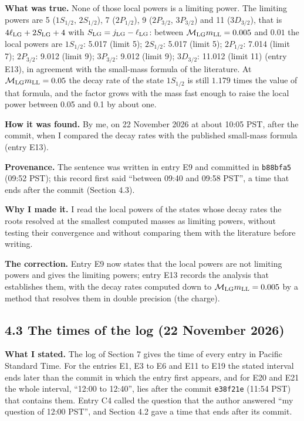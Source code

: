 \documentclass[
  10pt,
]{article}
\begin{document}
\textbf{What was true.} None of those local powers is a limiting power.
The limiting powers are 5 (\(1S_{1/2}\), \(2S_{1/2}\)), 7
(\(2P_{1/2}\)), 9 (\(2P_{3/2}\), \(3P_{3/2}\)) and 11 (\(3D_{3/2}\)),
that is \(4\ell_{\rm LG}+2S_{\rm LG}+4\) with
\(S_{\rm LG}=j_{\rm LG}-\ell_{\rm LG}\): between
\(\mathcal M_{\rm LG}m_{\rm LL}=0.005\) and \(0.01\) the local powers
are \(1S_{1/2}\): 5.017 (limit 5); \(2S_{1/2}\): 5.017 (limit 5);
\(2P_{1/2}\): 7.014 (limit 7); \(2P_{3/2}\): 9.012 (limit 9);
\(3P_{3/2}\): 9.012 (limit 9); \(3D_{3/2}\): 11.012 (limit 11) (entry
E13), in agreement with the small-mass formula of the literature. At
\(\mathcal M_{\rm LG}m_{\rm LL}=0.05\) the decay rate of the state
\(1S_{1/2}\) is still \(1.179\) times the value of that formula, and the
factor grows with the mass fast enough to raise the local power between
0.05 and 0.1 by about one.

\textbf{How it was found.} By me, on 22 November 2026 at about 10:05
PST, after the commit, when I compared the decay rates with the
published small-mass formula (entry E13).

\textbf{Provenance.} The sentence was written in entry E9 and committed
in \texttt{b88bfa5} (09:52 PST); this record first said ``between 09:40
and 09:58 PST'', a time that ends after the commit (Section 4.3).

\textbf{Why I made it.} I read the local powers of the states whose
decay rates the roots resolved at the smallest computed masses as
limiting powers, without testing their convergence and without comparing
them with the literature before writing.

\textbf{The correction.} Entry E9 now states that the local powers are
not limiting powers and gives the limiting powers; entry E13 records the
analysis that establishes them, with the decay rates computed down to
\(\mathcal M_{\rm LG}m_{\rm LL}=0.005\) by a method that resolves them
in double precision (the charge).

\hypertarget{the-times-of-the-log-22-november-2026}{%
\subsection{4.3 The times of the log (22 November
2026)}\label{the-times-of-the-log-22-november-2026}}

\textbf{What I stated.} The log of Section 7 gives the time of every
entry in Pacific Standard Time. For the entries E1, E3 to E6 and E11 to
E19 the stated interval ends later than the commit in which the entry
first appears, and for E20 and E21 the whole interval, ``12:00 to
12:40'', lies after the commit \texttt{e38f21e} (11:54 PST) that
contains them. Entry C4 called the question that the author answered
``my question of 12:00 PST'', and Section 4.2 gave a time that ends
after its commit.
\end{document}
